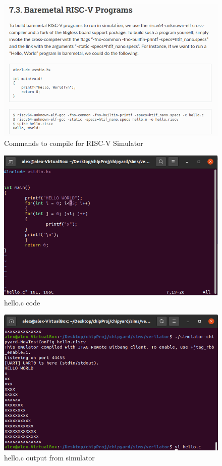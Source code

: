 \documentclass{../weeklyslides}
\begin{document}
\begin{frame}
  \begin{figure}
    \centering
    \includegraphics[width=0.9\linewidth]{"Baremetal RISCV instr"}
    \caption{Commands to compile for RISC-V Simulator}
    \label{fig:baremetal-riscv-instr}
  \end{figure}
\end{frame}

\begin{frame}
  \begin{figure}
	\centering
	\includegraphics[width=0.5\linewidth]{helloC}
	\caption{hello.c code}
	\label{fig:helloc}
  \end{figure}

  \begin{figure}
	\centering
	\includegraphics[width=0.5\linewidth]{helloCout}
	\caption{hello.c output from simulator}
	\label{fig:hellocout}
  \end{figure}
\end{frame}
\end{document}
